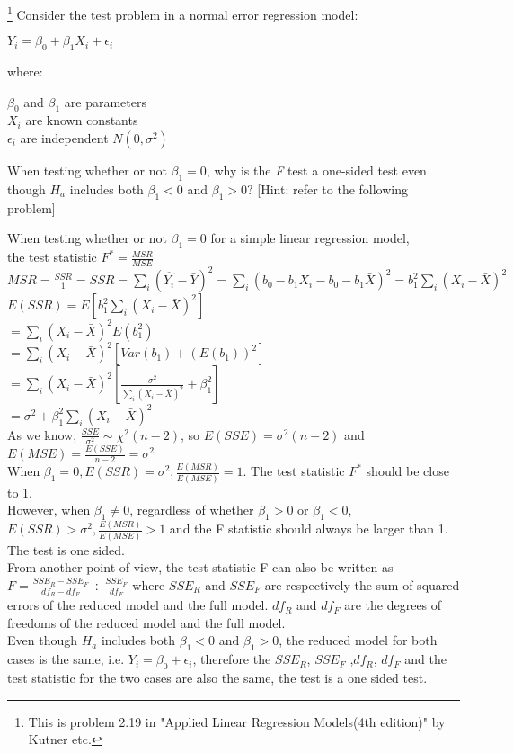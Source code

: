 \documentclass[12pt]{article}
\begin{document}
 {\footnote[2]{This is
problem 2.19 in "Applied Linear Regression Models(4th edition)" by
Kutner etc.} 
 Consider the test problem in a normal error regression model:
 \begin{center}
 $Y_i=\beta_0+\beta_1 X_i+\epsilon_i$\\
 \end{center}
 where:\\
 \begin{center}
 $\beta_0$ and $\beta_1$ are parameters\\
 $X_i$ are known constants\\
 $\epsilon_i$ are independent $N(0,\sigma^2)$
 \end{center}
 When testing whether or not $\beta_1=0$, why is the \textit{F} test a one-sided test even though $H_a$ includes both $\beta_1<0$ and $\beta_1>0$? [Hint: refer to the following problem]
   }
 { \vfill
  \answer
} { When testing whether or not $\beta_1=0$ for a simple linear regression model, \\
 the test statistic $F^*=\frac{MSR}{MSE}$\\

$MSR=\frac{SSR}{1}=SSR=\sum_i(\hat{Y_i}-\bar{Y})^2=\sum_i(b_0-b_1X_i-b_0-b_1\bar{X})^2=b_1^2\sum_i (X_i-\bar{X})^2$\\
$E(SSR)=E[b_1^2\sum_i (X_i-\bar{X})^2]$\\
$=\sum_i (X_i-\bar{X})^2E(b_1^2)$\\
$=\sum_i (X_i-\bar{X})^2[Var(b_1)+(E(b_1))^2]$\\
$=\sum_i (X_i-\bar{X})^2[\frac{\sigma^2}{\sum_i(X_i-\bar{X})^2}+\beta_1^2]$\\
$=\sigma^2+\beta_1^2\sum_i (X_i-\bar{X})^2$\\

As we know, $\frac{SSE}{\sigma^2}\sim \chi^2(n-2)$, so $ E(SSE)=\sigma^2(n-2)$ and $E(MSE)=\frac{E(SSE)}{n-2}=\sigma^2$\\
When $\beta_1=0, E(SSR)=\sigma^2, \frac{E(MSR)}{E(MSE)}=1$. The test statistic $F^*$ should be close to 1. \\
However, when $\beta_1\neq 0$, regardless of whether $\beta_1>0$ or $\beta_1<0$, $E(SSR)>\sigma^2,  \frac{E(MSR)}{E(MSE)}>1$ and the F statistic should always  be larger than 1. The test is one sided. \\
From another point of view, the test statistic F can also be written as $F=\frac{SSE_R-SSE_F}{df_R-df_F}\div\frac{SSE_F}{df_F}$ where $SSE_R$ and $SSE_F$ are respectively the sum of squared errors of the reduced model and the full model. $df_R$ and $df_F$ are the degrees of freedoms of the reduced model and the full model.\\
 Even though  $H_a$ includes both $\beta_1<0$ and $\beta_1>0$, the reduced model for both cases is the same, i.e. $Y_i=\beta_0+\epsilon_i$, therefore the $SSE_R$, $SSE_F$ ,$df_R$, $df_F$ and the test statistic for the two cases are also the same, the test is a one sided test. \\
}
\end{document}
